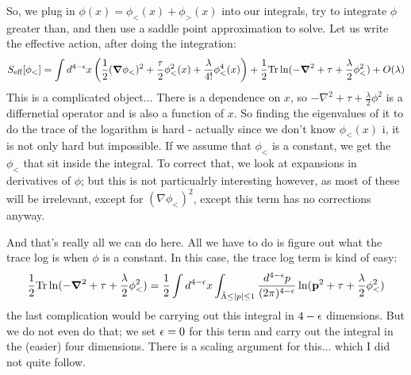 So, we plug in $\phi(x) = \phi_<(x) + \phi_>(x)$ into our integrals, try to integrate $\phi$ greater than, and then use a saddle point approximation to solve. Let us write the effective action, after doing the integration:
\begin{equation}
    S_{\text{eff}}[\phi_<] = \int d^{4-\e}x\left(\frac{1}{2}(\nabla \phi_<)^2 + \frac{\tau}{2}\phi_<^2(x) + \frac{\lambda}{4!}\phi^4_<(x)\right) + \frac{1}{2}\Tr\ln(-\nabla^2 + \tau + \frac{\lambda}{2}\phi_<^2) + O(\lambda)
\end{equation}
This is a complicated object... There is a dependence on $x$, so $-\nabla^2 + \tau + \frac{\lambda}{2}\phi^2$ is a differnetial operator and is also a function of $x$. So finding the eigenvalues of it to do the trace of the logarithm is hard - actually since we don't know $\phi_<(x)$ i, it is not only hard but impossible. If we assume that $\phi_<$ is a constant, we get the $\phi_<$ that sit inside the integral. To correct that, we look at expansions in derivatives of $\phi$; but this is not particualrly interesting however, as most of these will be irrelevant, except for $(\nabla \phi_<)^2$, except this term has no corrections anyway.

And that's really all we can do here. All we have to do is figure out what the trace log is when $\phi$ is a constant. In this case, the trace log term is kind of easy:
\begin{equation}
    \frac{1}{2}\Tr\ln(-\nabla^2 + \tau + \frac{\lambda}{2}\phi_<^2) = \frac{1}{2}\int d^{4-\e}x \int_{\tilde{\Lambda} \leq \abs{p} \leq 1} \frac{d^{4-\e}p}{(2\pi)^{4-\e}} \ln(\v{p}^2 + \tau + \frac{\lambda}{2}\phi_<^2)
\end{equation}
the last complication would be carrying out this integral in $4 - \epsilon$ dimensions. But we do not even do that; we set $\epsilon = 0$ for this term and carry out the integral in the (easier) four dimensions. There is a scaling argument for this... which I did not quite follow. 

